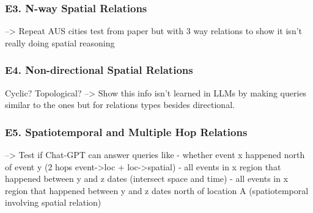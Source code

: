 \subsubsection{E3. N-way Spatial Relations}
--> Repeat AUS cities test from \cite{Qi2023} paper but with 3 way relations to show it isn't really doing spatial reasoning

\subsubsection{E4. Non-directional Spatial Relations}
Cyclic? Topological?
--> Show this info isn't learned in LLMs by making queries similar to the \cite{Qi2023} ones but for relations types besides directional.

\subsubsection{E5. Spatiotemporal and Multiple Hop Relations}
--> Test if Chat-GPT can answer queries like
- whether event x happened north of event y (2 hops event->loc + loc->spatial)
- all events in x region that happened between y and z dates (intersect space and time)
- all events in x region that happened between y and z dates north of location A (spatiotemporal involving spatial relation)








        





